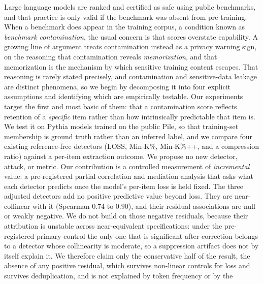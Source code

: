 Large language models are ranked and certified as safe using public benchmarks, and that
practice is only valid if the benchmark was absent from pre-training. When a benchmark
does appear in the training corpus, a condition known as \emph{benchmark contamination},
the usual concern is that scores overstate capability. A growing line of argument treats
contamination instead as a privacy warning sign, on the reasoning that contamination
reveals \emph{memorization}, and that memorization is the mechanism by which sensitive
training content escapes. That reasoning is rarely stated precisely, and contamination and
sensitive-data leakage are distinct phenomena, so we begin by decomposing it into four
explicit assumptions and identifying which are empirically testable. Our experiments
target the first and most basic of them: that a contamination score reflects retention of
a \emph{specific} item rather than how intrinsically predictable that item is. We test it
on Pythia models trained on the public Pile, so that training-set membership is ground
truth rather than an inferred label, and we compare four existing reference-free
detectors (LOSS, Min-K\%, Min-K\%++, and a compression ratio) against a per-item
extraction outcome. We propose no new detector, attack, or metric. Our contribution is a
controlled measurement of \emph{incremental} value: a pre-registered partial-correlation
and mediation analysis that asks what each detector predicts once the model's per-item
loss is held fixed. The three adjusted detectors add no positive predictive value beyond
loss. They are near-collinear with it (Spearman $0.74$ to $0.90$), and their residual
associations are null or weakly negative. We do not build on those negative residuals,
because their attribution is unstable across near-equivalent specifications: under the
pre-registered primary control the only one that is significant after correction belongs to
a detector whose collinearity is moderate, so a suppression artifact does not by itself
explain it. We therefore claim only the conservative half of the result, the absence of any
positive residual, which survives non-linear controls for loss and
survives deduplication, and is not explained by token frequency or by the
